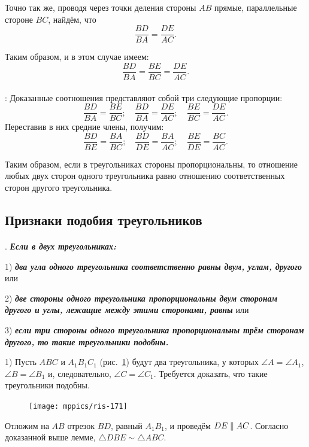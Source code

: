 \documentclass[twoside]{book}
\begin{document}
Точно так же, проводя через точки деления стороны $AB$ прямые, параллельные стороне $BC$, найдём, что
\[\frac{BD}{BA}=\frac{DE}{AC}.\]

Таким образом, и в этом случае имеем:
\[\frac{BD}{BA}=\frac{BE}{BC}=\frac{DE}{AC}.\]


\paragraph{}\label{1938/160}
:
Доказанные соотношения представляют собой три следующие пропорции:
\[\frac{BD}{BA}=\frac{BE}{BC};
\quad
\frac{BD}{BA}=\frac{DE}{AC};
\quad
\frac{BE}{BC}=\frac{DE}{AC}.\]
Переставив в них средние члены, получим:
\[\frac{BD}{BE}=\frac{BA}{BC};
\quad
\frac{BD}{DE}=\frac{BA}{AC};
\quad
\frac{BE}{DE}=\frac{BC}{AC}.\]

Таким образом, если в треугольниках стороны пропорциональны, то отношение любых двух сторон одного треугольника равно отношению соответственных сторон другого треугольника.

\subsection*{Признаки подобия треугольников}

\paragraph{}\label{1938/161}
.
\textbf{\emph{Если в двух треугольниках:}}

1) \textbf{\emph{два угла одного треугольника соответственно равны двум, углам, другого}} или

2) \textbf{\emph{две стороны одного треугольника пропорциональны двум сторонам другого и углы, лежащие между этими сторонами, равны}} или

3) \textbf{\emph{если три стороны одного треугольника пропорциональны трём сторонам другого, то такие треугольники подобны.}}

1) Пусть $ABC$ и $A_1B_1C_1$ (рис.~\ref{1938/ris-171}) будут два треугольника, у которых $\angle A = \angle A_1$, $\angle B=\angle B_1$ и, следовательно, $\angle C=\angle C_1$.
Требуется доказать, что такие треугольники подобны.

\begin{figure}[h!]
\centering
\texttt{[image: mppics/ris-171]}
\caption{}\label{1938/ris-171}
\end{figure}

Отложим на $AB$ отрезок $BD$, равный $A_1B_1$, и проведём $DE\z\parallel AC$.
Согласно доказанной выше лемме, $\triangle DBE\sim\triangle ABC$.
\end{document}
